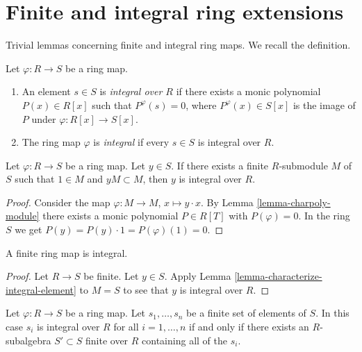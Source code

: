 \section{Finite and integral ring extensions}
\label{section-finite-ring-extensions}

\noindent
Trivial lemmas concerning finite and integral ring maps.
We recall the definition.

\begin{definition}
\label{definition-integral-ring-map}
Let $\varphi : R \to S$ be a ring map.
\begin{enumerate}
\item An element $s \in S$
is {\it integral over $R$} if there exists a monic
polynomial $P(x) \in R[x]$ such that
$P^\varphi(s) = 0$, where $P^\varphi(x) \in S[x]$
is the image of $P$ under $\varphi : R[x] \to S[x]$.
\item  The ring map $\varphi$ is {\it integral}
if every $s \in S$ is integral over $R$.
\end{enumerate}
\end{definition}

\begin{lemma}
\label{lemma-characterize-integral-element}
Let $\varphi : R \to S$ be a ring map. Let $y \in S$. If there exists a
finite $R$-submodule $M$ of $S$ such that $1 \in M$ and $yM \subset M$,
then $y$ is integral over $R$.
\end{lemma}

\begin{proof}
Consider the map $\varphi : M \to M$, $x \mapsto y \cdot x$.
By Lemma \ref{lemma-charpoly-module} there exists a monic polynomial
$P \in R[T]$ with $P(\varphi) = 0$. In the ring $S$ we get
$P(y) = P(y) \cdot 1 = P(\varphi)(1) = 0$.
\end{proof}

\begin{lemma}
\label{lemma-finite-is-integral}
A finite ring map is integral.
\end{lemma}

\begin{proof}
Let $R \to S$ be finite. Let $y \in S$. Apply
Lemma \ref{lemma-characterize-integral-element}
to $M = S$ to see that $y$ is integral over $R$.
\end{proof}

\begin{lemma}
\label{lemma-characterize-integral}
Let $\varphi : R \to S$ be a ring map. Let $s_1, \ldots, s_n$
be a finite set of elements of $S$.
In this case $s_i$ is integral over $R$ for all $i = 1, \ldots, n$
if and only if
there exists an $R$-subalgebra $S' \subset S$ finite over $R$
containing all of the $s_i$.
\end{lemma}

